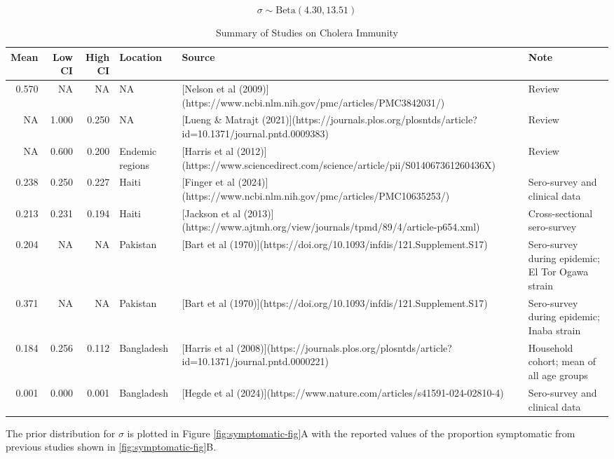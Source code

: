 \documentclass[
]{book}
\begin{document}
\begin{equation}
\sigma \sim \text{Beta}(4.30, 13.51)
\end{equation}

\begin{table}

\caption{\label{tab:symptomatic-table}Summary of Studies on Cholera Immunity}
\centering
\begin{tabular}[t]{r|r|r|l|l|l}
\hline
Mean & Low CI & High CI & Location & Source & Note\\
\hline
0.570 & NA & NA & NA & [Nelson et al (2009)](https://www.ncbi.nlm.nih.gov/pmc/articles/PMC3842031/) & Review\\
\hline
NA & 1.000 & 0.250 & NA & [Lueng \& Matrajt (2021)](https://journals.plos.org/plosntds/article?id=10.1371/journal.pntd.0009383) & Review\\
\hline
NA & 0.600 & 0.200 & Endemic regions & [Harris et al (2012)](https://www.sciencedirect.com/science/article/pii/S014067361260436X) & Review\\
\hline
0.238 & 0.250 & 0.227 & Haiti & [Finger et al (2024)](https://www.ncbi.nlm.nih.gov/pmc/articles/PMC10635253/) & Sero-survey and clinical data\\
\hline
0.213 & 0.231 & 0.194 & Haiti & [Jackson et al (2013)](https://www.ajtmh.org/view/journals/tpmd/89/4/article-p654.xml) & Cross-sectional sero-survey\\
\hline
0.204 & NA & NA & Pakistan & [Bart et al (1970)](https://doi.org/10.1093/infdis/121.Supplement.S17) & Sero-survey during epidemic; El Tor Ogawa strain\\
\hline
0.371 & NA & NA & Pakistan & [Bart et al (1970)](https://doi.org/10.1093/infdis/121.Supplement.S17) & Sero-survey during epidemic; Inaba strain\\
\hline
0.184 & 0.256 & 0.112 & Bangladesh & [Harris et al (2008)](https://journals.plos.org/plosntds/article?id=10.1371/journal.pntd.0000221) & Household cohort; mean of all age groups\\
\hline
0.001 & 0.000 & 0.001 & Bangladesh & [Hegde et al (2024)](https://www.nature.com/articles/s41591-024-02810-4) & Sero-survey and clinical data\\
\hline
\end{tabular}
\end{table}

The prior distribution for \(\sigma\) is plotted in Figure \ref{fig:symptomatic-fig}A with the reported values of the proportion symptomatic from previous studies shown in \ref{fig:symptomatic-fig}B.
\end{document}
